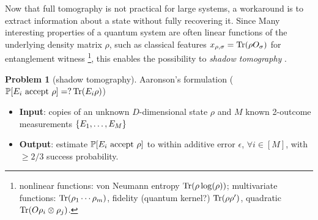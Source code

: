 \documentclass[
aps,
pra,
twocolumn,
floatfix,
]{revtex4-2}
\theoremstyle{plain}
\theoremstyle{definition}
\newtheorem{problem}{Problem}
\newcommand{\ob}{O}
\newcommand{\pob}{O}
\newcommand{\dm}{\rho}
\begin{document}
Now that full tomography is not practical for large systems, a workaround is to extract information about a state without fully recovering it.
Since Many interesting properties of a quantum system are often linear functions of the underlying density matrix $\dm$, such as classical features $x_{\dm,\sigma}=\Tr(\dm\pob_{\sigma}) $ for entanglement witness
\footnote{nonlinear functions: von Neumann entropy $\Tr(\dm\log(\dm))$;
multivariate functions:  $\Tr(\dm_1 \cdots \dm_m)$, fidelity (quantum kernel?) $\Tr(\dm\dm')$,  quadratic $\Tr(\ob \dm_i \otimes \dm_j)$.},
this enables the possibility to \emph{shadow tomography} \cite{aaronsonShadowTomographyQuantum2018}.
\begin{problem}[shadow tomography]\label{prm:shadow_tomography}
	Aaronson's formulation	
	($\probability[E_i \text{ accept } \dm]=?\Tr(E_i \dm)$)
	\begin{itemize}
		\item \textbf{Input}: copies of an unknown $D$-dimensional state $\rho$ and $M$ known 2-outcome measurements $\qty{E_1,\dots,E_M}$
		\item \textbf{Output}: estimate $\probability[E_i \text{ accept } \dm]$ to within additive error $\epsilon$, $\forall i\in [M]$, with $\ge 2/3$ success probability.	
	\end{itemize}
\end{problem}
\end{document}
